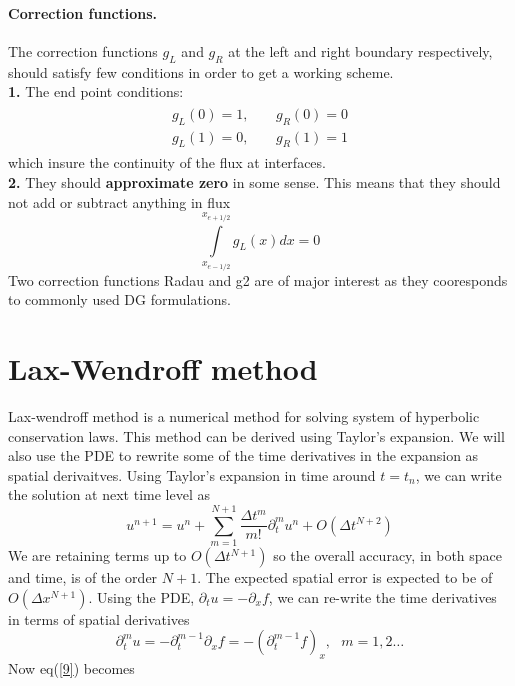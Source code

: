 \paragraph{Correction functions.} The correction functions $g_L$ and $g_R$ at the left and right boundary respectively, should satisfy few conditions in order to get a working scheme.\\
\textbf{1.} The end point conditions:
\begin{align*}
    \begin{split}
        g_L(0) = 1,&~~~~~g_R(0) = 0\\
        g_L(1) = 0,&~~~~~g_R(1) = 1
    \end{split}
\end{align*}
which insure the continuity of the flux at interfaces.\\
\textbf{2.} They should \textbf{approximate zero} in some sense. This means that they should not add or subtract anything in flux
\begin{equation*}
    \int\limits_{x_{e-1/2}}^{x_{e+1/2}}g_L(x) dx = 0
\end{equation*}
Two correction functions Radau and g2 are of major interest as they cooresponds to commonly used DG formulations.

\section{Lax-Wendroff method}
Lax-wendroff method is a numerical method for solving system of hyperbolic conservation laws. This method can be derived using Taylor's expansion. We will also use the PDE to rewrite some of the time derivatives in the expansion as spatial derivaitves. Using Taylor's expansion in time around $t = t_n$, we can write the solution at next time level as
\begin{equation} \label{9}
    u^{n+1} = u^n + \sum\limits_{m=1}^{N+1} \frac{\Delta t^m}{m!}\partial_t^mu^n + O(\Delta t^{N+2})
\end{equation}
We are retaining terms up to $O(\Delta t^{N+1})$ so the overall accuracy, in both space and time, is of the order $N+1$. The expected spatial error is expected to be of $O(\Delta x^{N+1})$.
Using the PDE, $ \partial_t u = -\partial_x f$, we can re-write the time derivatives in terms of spatial derivatives
\begin{equation*}
    \partial_t^m u = -\partial_t^{m-1} \partial_xf = -(\partial_t^{m-1}f)_x, \hspace{8pt} m = 1,2 \dots
\end{equation*}
Now eq(\ref{9}) becomes

